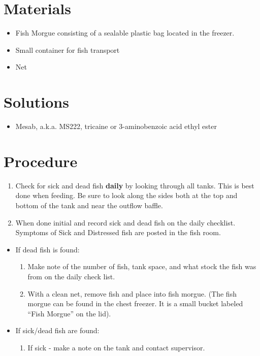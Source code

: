 \documentclass[
  letterpaper,
  DIV=11,
  numbers=noendperiod]{scrreprt}
\providecommand{\tightlist}{%
  \setlength{\itemsep}{0pt}\setlength{\parskip}{0pt}}\usepackage{longtable,booktabs,array}
\begin{document}
\hypertarget{materials-33}{%
\section{Materials}\label{materials-33}}

\begin{itemize}
\tightlist
\item
  Fish Morgue consisting of a sealable plastic bag located in the
  freezer.
\item
  Small container for fish transport
\item
  Net
\end{itemize}

\hypertarget{solutions-26}{%
\section{Solutions}\label{solutions-26}}

\begin{itemize}
\tightlist
\item
  Mesab, a.k.a. MS222, tricaine or 3-aminobenzoic acid ethyl ester
\end{itemize}

\hypertarget{procedure-33}{%
\section{Procedure}\label{procedure-33}}

\begin{enumerate}
\def\labelenumi{\arabic{enumi}.}
\tightlist
\item
  Check for sick and dead fish \textbf{daily} by looking through all
  tanks. This is best done when feeding. Be sure to look along the sides
  both at the top and bottom of the tank and near the outflow baffle.
\item
  When done initial and record sick and dead fish on the daily
  checklist. Symptoms of Sick and Distressed fish are posted in the fish
  room.
\end{enumerate}

\begin{itemize}
\tightlist
\item
  If dead fish is found:

  \begin{enumerate}
  \def\labelenumi{\arabic{enumi}.}
  \tightlist
  \item
    Make note of the number of fish, tank space, and what stock the fish
    was from on the daily check list.
  \item
    With a clean net, remove fish and place into fish morgue. (The fish
    morgue can be found in the chest freezer. It is a small bucket
    labeled ``Fish Morgue'' on the lid).
  \end{enumerate}
\item
  If sick/dead fish are found:

  \begin{enumerate}
  \def\labelenumi{\arabic{enumi}.}
  \tightlist
  \item
    If sick - make a note on the tank and contact supervisor.
  \end{enumerate}
\end{itemize}
\end{document}
